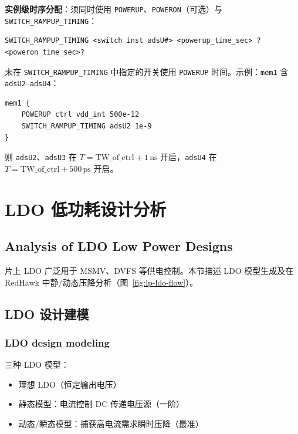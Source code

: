 \textbf{实例级时序分配}：须同时使用 \texttt{POWERUP}、\texttt{POWERON}（可选）与 \texttt{SWITCH\_RAMPUP\_TIMING}：
\begin{lstlisting}
SWITCH_RAMPUP_TIMING <switch inst adsU#> <powerup_time_sec> ?<poweron_time_sec>?
\end{lstlisting}

未在 \texttt{SWITCH\_RAMPUP\_TIMING} 中指定的开关使用 \texttt{POWERUP} 时间。示例：\texttt{mem1} 含 \texttt{adsU2}--\texttt{adsU4}：
\begin{lstlisting}
mem1 {
    POWERUP ctrl vdd_int 500e-12
    SWITCH_RAMPUP_TIMING adsU2 1e-9
}
\end{lstlisting}
则 \texttt{adsU2}、\texttt{adsU3} 在 $T = \mathrm{TW\_of\_ctrl} + 1\,\mathrm{ns}$ 开启，\texttt{adsU4} 在 $T = \mathrm{TW\_of\_ctrl} + 500\,\mathrm{ps}$ 开启。

\section{LDO 低功耗设计分析}
\subsection*{Analysis of LDO Low Power Designs}

片上 LDO 广泛用于 MSMV、DVFS 等供电控制。本节描述 LDO 模型生成及在 RedHawk 中静/动态压降分析（图~\ref{fig:lp-ldo-flow}）。


\subsection{LDO 设计建模}
\subsubsection*{LDO design modeling}

三种 LDO 模型：
\begin{itemize}
  \item 理想 LDO（恒定输出电压）
  \item 静态模型：电流控制 DC 传递电压源（一阶）
  \item 动态/瞬态模型：捕获高电流需求瞬时压降（最准）
\end{itemize}



